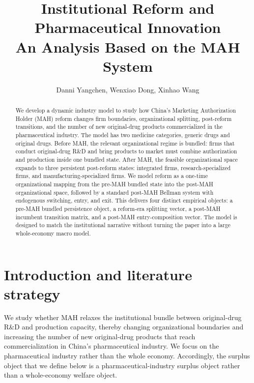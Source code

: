 \documentclass[12pt]{article}
\title{Institutional Reform and Pharmaceutical Innovation
\\An Analysis Based on the MAH System}
\author{Danni Yangchen, Wenxiao Dong, Xinhao Wang}
\date{}
\newcommand{\1}{\mathbf{1}}
\begin{document}
\maketitle

\begin{abstract}
We develop a dynamic industry model to study how China's Marketing Authorization Holder (MAH) reform changes firm boundaries, organizational splitting, post-reform transitions, and the number of new original-drug products commercialized in the pharmaceutical industry. The model has two medicine categories, generic drugs and original drugs. Before MAH, the relevant organizational regime is bundled: firms that conduct original-drug R\&D and bring products to market must combine authorization and production inside one bundled state. After MAH, the feasible organizational space expands to three persistent post-reform states: integrated firms, research-specialized firms, and manufacturing-specialized firms. We model reform as a one-time organizational mapping from the pre-MAH bundled state into the post-MAH organizational space, followed by a standard post-MAH Bellman system with endogenous switching, entry, and exit. This delivers four distinct empirical objects: a pre-MAH bundled persistence object, a reform-era splitting vector, a post-MAH incumbent transition matrix, and a post-MAH entry-composition vector. The model is designed to match the institutional narrative without turning the paper into a large whole-economy macro model.
\end{abstract}

\section{Introduction and literature strategy}

We study whether MAH relaxes the institutional bundle between original-drug R\&D and production capacity, thereby changing organizational boundaries and increasing the number of new original-drug products that reach commercialization in China's pharmaceutical industry. We focus on the pharmaceutical industry rather than the whole economy. Accordingly, the surplus object that we define below is a pharmaceutical-industry surplus object rather than a whole-economy welfare object.
\end{document}
